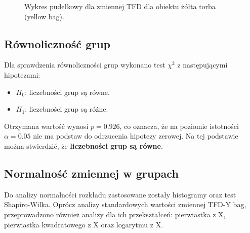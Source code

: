     \begin{figure}[H]
        \centering
        \label{fig:boxTFD_yBag}
        \caption{Wykres pudełkowy dla zmiennej TFD dla obiektu żółta torba (yellow bag).}
    \end{figure}

    \subsection{Równoliczność grup}
    Dla sprawdzenia równoliczności grup wykonano test $\chi^2$ z następującymi hipotezami:
    \begin{itemize}
        \item $H_0$: liczebności grup są równe.
        \item $H_1$: liczebności grup są różne.
    \end{itemize}
    Otrzymana wartość wynosi \textbf{$p=0.926$}, co oznacza, że na poziomie istotności $\alpha=0.05$
    nie ma podstaw do odrzucenia hipotezy zerowej. Na tej podstawie można stwierdzić, że \textbf{liczebności grup są równe}.
    

    \subsection{Normalność zmiennej w grupach}
    Do analizy normalności rozkładu zastosowane zostały histogramy oraz test Shapiro-Wilka. Oprócz analizy standardowych wartości
    zmiennej TFD-Y bag, przeprowadzono również analizy dla ich przekształceń: pierwiastka z X, pierwiastka kwadratowego z X oraz logarytmu z X.

